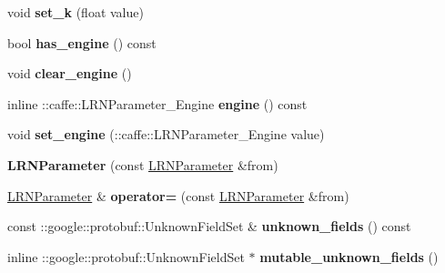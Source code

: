 \begin{DoxyCompactItemize}
\mbox{\label{classcaffe_1_1_l_r_n_parameter_aa3e97b8b626a261f2776cb009f7896c6}} 
void {\bfseries set\+\_\+k} (float value)
\item 
\mbox{\label{classcaffe_1_1_l_r_n_parameter_ab67bd760719f898a46c3977b80105847}} 
bool {\bfseries has\+\_\+engine} () const
\item 
\mbox{\label{classcaffe_1_1_l_r_n_parameter_aaf26e5acd07b82af851b4609adff1e5b}} 
void {\bfseries clear\+\_\+engine} ()
\item 
\mbox{\label{classcaffe_1_1_l_r_n_parameter_a898cfef0b8d1ab8f9fe2ac8229d549fb}} 
inline \+::caffe\+::\+L\+R\+N\+Parameter\+\_\+\+Engine {\bfseries engine} () const
\item 
\mbox{\label{classcaffe_1_1_l_r_n_parameter_a9fcab56fffaa5eec6ce3a116764ad053}} 
void {\bfseries set\+\_\+engine} (\+::caffe\+::\+L\+R\+N\+Parameter\+\_\+\+Engine value)
\item 
\mbox{\label{classcaffe_1_1_l_r_n_parameter_a51228f8492576cc55ba96e8d19580a26}} 
{\bfseries L\+R\+N\+Parameter} (const \mbox{\hyperlink{classcaffe_1_1_l_r_n_parameter}{L\+R\+N\+Parameter}} \&from)
\item 
\mbox{\label{classcaffe_1_1_l_r_n_parameter_a7126b3d84c9faa653de8981fde98efd2}} 
\mbox{\hyperlink{classcaffe_1_1_l_r_n_parameter}{L\+R\+N\+Parameter}} \& {\bfseries operator=} (const \mbox{\hyperlink{classcaffe_1_1_l_r_n_parameter}{L\+R\+N\+Parameter}} \&from)
\item 
\mbox{\label{classcaffe_1_1_l_r_n_parameter_ac3ba7bac658ae91ea55fa643793effae}} 
const \+::google\+::protobuf\+::\+Unknown\+Field\+Set \& {\bfseries unknown\+\_\+fields} () const
\item 
\mbox{\label{classcaffe_1_1_l_r_n_parameter_a92ad76febb07f8deb47ae706354a661b}} 
inline \+::google\+::protobuf\+::\+Unknown\+Field\+Set $\ast$ {\bfseries mutable\+\_\+unknown\+\_\+fields} ()

\end{DoxyCompactItemize}
